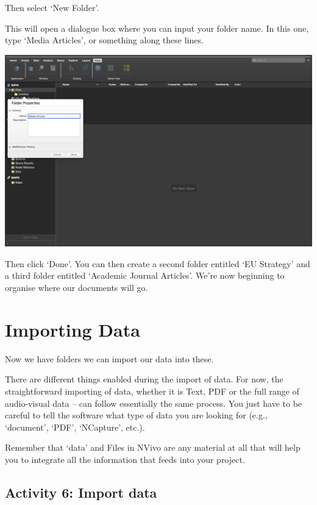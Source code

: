 \documentclass[
]{book}
\begin{document}
Then select `New Folder'.

This will open a dialogue box where you can input your folder name. In this one, type `Media Articles', or something along these lines.

\includegraphics{imgs/name_folder.png}

Then click `Done'. You can then create a second folder entitled `EU Strategy' and a third folder entitled `Academic Journal Articles'. We're now beginning to organise where our documents will go.

\hypertarget{importing-data}{%
\section{Importing Data}\label{importing-data}}

Now we have folders we can import our data into these.

There are different things enabled during the import of data. For now, the straightforward importing of data, whether it is Text, PDF or the full range of audio-visual data -- can follow essentially the same process. You just have to be careful to tell the software what type of data you are looking for (e.g., `document', `PDF', `NCapture', etc.).

Remember that `data' and Files in NVivo are any material at all that will help you to integrate all the information that feeds into your project.

\hypertarget{activity-6-import-data}{%
\subsection{Activity 6: Import data}\label{activity-6-import-data}}
\end{document}
